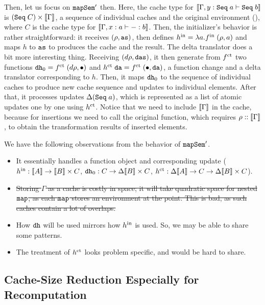 \documentclass{article}
\theoremstyle{definition}
\begin{document}
Then, let us focus on $\texttt{mapSem}'$ then. Here, the cache type for $\sem{ \Gamma, y : \con{Seq} \A a \vdash \con{Seq} \A b }$ 
is $(\con{Seq} \A C) \x \sem{\Gamma}$, a sequence of individual caches and the original environment (),
 where $C$ is the cache type for 
$\sem{ \Gamma, x : a \vdash - : b }$. Then, the initializer's behavior is rather straightforward: it receives $(\rho, \texttt{as})$,
then defines $h^{\text{in}} = \lambda a.f^{\text{in}} \; (\rho,a)$ and maps $h$ to $\texttt{as}$ to produces the cache and the result. 
The delta translator does a bit more interesting thing. Receiving $(d\rho, \texttt{das})$, 
it then generate from $f^{\text{ct}}$ two functions $\texttt{dh}_0 = f^{\text{ct}} \; (d\rho, {\bullet})$ and 
$h^{\text{ct}} \; \texttt{da} = f^{\text{ct}} \; ({\bullet}, \texttt{da})$, a function change and a delta translator corresponding to $h$. 
Then, it maps $\texttt{dh}_0$ to the sequence of individual caches to produce new cache sequence and updates to individual elements.
After that, it processes updates $\Delta (\texttt{Seq} \; a)$, which is represented as a list of atomic updates one by one using $h^{\text{ct}}$. 
Notice that we need to include $\sem{\Gamma}$ in the cache, because for insertions we need to call the original function, which requires $\rho :: \sem{\Gamma}$, to obtain the transformation results of inserted elements. 

We have the following observations from the behavior of $\texttt{mapSem}'$. 
\begin{itemize}
 \item It essentially handles a function object and corresponding update ($\init{h} : \sem{A} \to \sem{B} \x C$, $\var{dh}_0 : C \to \Delta \sem{B} \x C$, $\cts{h} : \Delta \sem{A} \to C \to \Delta \sem{B} \x C$).
 \item \sout{Storing $\Gamma$ as a cache is costly in space; it will take quadratic space for nested $\texttt{map}$, as each $\texttt{map}$ stores 
   an environment at the point. This is bad, as such caches contain a lot of overlaps. } 
 \item How $\texttt{dh}$ will be used mirrors how $h^{\text{in}}$ is used. So, we may be able to share some patterns. 
 \item The treatment of $h^{\text{ct}}$ looks problem specific, and would be hard to share. 
\end{itemize}


\subsection{Cache-Size Reduction Especially for Recomputation}
\label{sec:cache-size-optimized-version}
\end{document}
